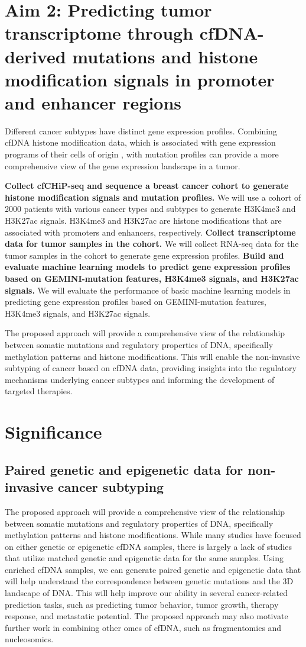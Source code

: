 \documentclass[11pt]{article}
\begin{document}
\section*{Aim 2: Predicting tumor transcriptome through cfDNA-derived mutations and histone modification signals in promoter and enhancer regions}
Different cancer subtypes have distinct gene expression profiles. Combining cfDNA histone modification data, which is associated with gene expression programs of their cells of origin \cite{sadeh_chip-seq_2021, trier_maansson_cell-free_2023}, with mutation profiles can provide a more comprehensive view of the gene expression landscape in a tumor.

	\textbf{Collect cfCHiP-seq \cite{baca_liquid_2023} and sequence a breast cancer cohort to generate histone modification signals and mutation profiles.} We will use a cohort of 2000 patients with various cancer types and subtypes to generate H3K4me3 and H3K27ac signals. H3K4me3 and H3K27ac are histone modifications that are associated with promoters and enhancers, respectively.
	\textbf{Collect transcriptome data for tumor samples in the cohort.} We will collect RNA-seq data for the tumor samples in the cohort to generate gene expression profiles.
	\textbf{Build and evaluate machine learning models to predict gene expression profiles based on GEMINI-mutation features, H3K4me3 signals, and H3K27ac signals.} We will evaluate the performance of basic machine learning models in predicting gene expression profiles based on GEMINI-mutation features, H3K4me3 signals, and H3K27ac signals. 

The proposed approach will provide a comprehensive view of the relationship between somatic mutations and regulatory properties of DNA, specifically methylation patterns and histone modifications. This will enable the non-invasive subtyping of cancer based on cfDNA data, providing insights into the regulatory mechanisms underlying cancer subtypes and informing the development of targeted therapies.

\newpage
\section*{Significance}
\subsection*{Paired genetic and epigenetic data for non-invasive cancer subtyping} The proposed approach will provide a comprehensive view of the relationship between somatic mutations and regulatory properties of DNA, specifically methylation patterns and histone modifications. While many studies have focused on either genetic or epigenetic cfDNA samples, there is largely a lack of studies that utilize matched genetic and epigenetic data for the same samples. Using enriched cfDNA samples, we can generate paired genetic and epigenetic data that will help understand the correspondence between genetic mutations and the 3D landscape of DNA. This will help improve our ability in several cancer-related prediction tasks, such as predicting tumor behavior, tumor growth, therapy response, and metastatic potential. The proposed approach may also motivate further work in combining other omes of cfDNA, such as fragmentomics and nucleosomics.  
\end{document}
